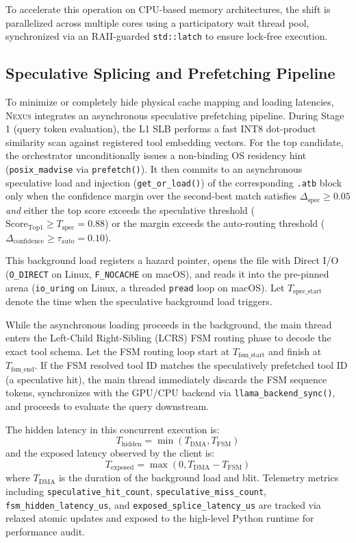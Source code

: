 \documentclass[conference,10pt]{IEEEtran}
\newcommand{\Nexus}{\textsc{Nexus}\xspace}
\newcommand{\atb}{\texttt{.atb}\xspace}
\begin{document}
To accelerate this operation on CPU-based memory architectures, the shift is parallelized across multiple cores using a participatory wait thread pool, synchronized via an RAII-guarded \texttt{std::latch} to ensure lock-free execution.

\subsection{Speculative Splicing and Prefetching Pipeline}
\label{subsec:arch-speculative}
To minimize or completely hide physical cache mapping and loading latencies, \Nexus integrates an asynchronous speculative prefetching pipeline. During Stage 1 (query token evaluation), the L1 SLB performs a fast INT8 dot-product similarity scan against registered tool embedding vectors. For the top candidate, the orchestrator unconditionally issues a non-binding OS residency hint (\texttt{posix\_madvise} via \texttt{prefetch()}). It then commits to an asynchronous speculative load and injection (\texttt{get\_or\_load()}) of the corresponding \atb block only when the confidence margin over the second-best match satisfies $\Delta_{\text{spec}} \ge 0.05$ \emph{and} either the top score exceeds the speculative threshold ($\text{Score}_{\text{Top1}} \ge T_{\text{spec}} = 0.88$) or the margin exceeds the auto-routing threshold ($\Delta_{\text{confidence}} \ge \tau_{\text{auto}} = 0.10$).

This background load registers a hazard pointer, opens the file with Direct I/O (\texttt{O\_DIRECT} on Linux, \texttt{F\_NOCACHE} on macOS), and reads it into the pre-pinned arena (\texttt{io\_uring} on Linux, a threaded \texttt{pread} loop on macOS). Let $T_{\text{spec\_start}}$ denote the time when the speculative background load triggers. 

While the asynchronous loading proceeds in the background, the main thread enters the Left-Child Right-Sibling (LCRS) FSM routing phase to decode the exact tool schema. Let the FSM routing loop start at $T_{\text{fsm\_start}}$ and finish at $T_{\text{fsm\_end}}$. If the FSM resolved tool ID matches the speculatively prefetched tool ID (a speculative hit), the main thread immediately discards the FSM sequence tokens, synchronizes with the GPU/CPU backend via \texttt{llama\_backend\_sync()}, and proceeds to evaluate the query downstream.

The hidden latency in this concurrent execution is:
\begin{equation}
T_{\text{hidden}} = \min(T_{\text{DMA}}, T_{\text{FSM}})
\end{equation}
and the exposed latency observed by the client is:
\begin{equation}
T_{\text{exposed}} = \max(0, T_{\text{DMA}} - T_{\text{FSM}})
\end{equation}
where $T_{\text{DMA}}$ is the duration of the background load and blit. Telemetry metrics including \texttt{speculative\_hit\_count}, \texttt{speculative\_miss\_count}, \texttt{fsm\_hidden\_latency\_us}, and \texttt{exposed\_splice\_latency\_us} are tracked via relaxed atomic updates and exposed to the high-level Python runtime for performance audit.
\end{document}
